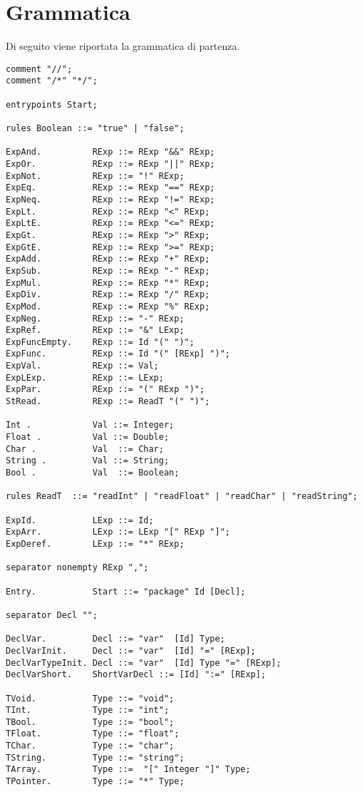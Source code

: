 \documentclass[12pt]{article}
\begin{document}
\section*{Grammatica}
Di seguito viene riportata la grammatica di partenza.
\begin{verbatim}
comment "//";
comment "/*" "*/";

entrypoints Start;

rules Boolean ::= "true" | "false";

ExpAnd.          RExp ::= RExp "&&" RExp;
ExpOr.           RExp ::= RExp "||" RExp;
ExpNot.          RExp ::= "!" RExp; 
ExpEq.           RExp ::= RExp "==" RExp;
ExpNeq.          RExp ::= RExp "!=" RExp;
ExpLt.           RExp ::= RExp "<" RExp;
ExpLtE.          RExp ::= RExp "<=" RExp;
ExpGt.           RExp ::= RExp ">" RExp;
ExpGtE.          RExp ::= RExp ">=" RExp;
ExpAdd.          RExp ::= RExp "+" RExp;
ExpSub.          RExp ::= RExp "-" RExp;
ExpMul.          RExp ::= RExp "*" RExp;
ExpDiv.          RExp ::= RExp "/" RExp;
ExpMod.          RExp ::= RExp "%" RExp;
ExpNeg.          RExp ::= "-" RExp;
ExpRef.          RExp ::= "&" LExp;
ExpFuncEmpty.    RExp ::= Id "(" ")";
ExpFunc.         RExp ::= Id "(" [RExp] ")";
ExpVal.          RExp ::= Val;
ExpLExp.         RExp ::= LExp;
ExpPar.          RExp ::= "(" RExp ")";
StRead.          RExp ::= ReadT "(" ")";

Int .            Val ::= Integer;
Float .          Val ::= Double;
Char .           Val  ::= Char;
String .         Val ::= String;
Bool .           Val  ::= Boolean;

rules ReadT  ::= "readInt" | "readFloat" | "readChar" | "readString";

ExpId.           LExp ::= Id;
ExpArr.          LExp ::= LExp "[" RExp "]";
ExpDeref.        LExp ::= "*" RExp;

separator nonempty RExp ",";

Entry.           Start ::= "package" Id [Decl];

separator Decl "";

DeclVar.         Decl ::= "var"  [Id] Type;
DeclVarInit.     Decl ::= "var"  [Id] "=" [RExp];
DeclVarTypeInit. Decl ::= "var"  [Id] Type "=" [RExp];
DeclVarShort.    ShortVarDecl ::= [Id] ":=" [RExp];

TVoid.           Type ::= "void";
TInt.            Type ::= "int";
TBool.           Type ::= "bool";
TFloat.          Type ::= "float";
TChar.           Type ::= "char";
TString.         Type ::= "string";
TArray.          Type ::=  "[" Integer "]" Type; 
TPointer.        Type ::= "*" Type; 


\end{verbatim}
\end{document}
